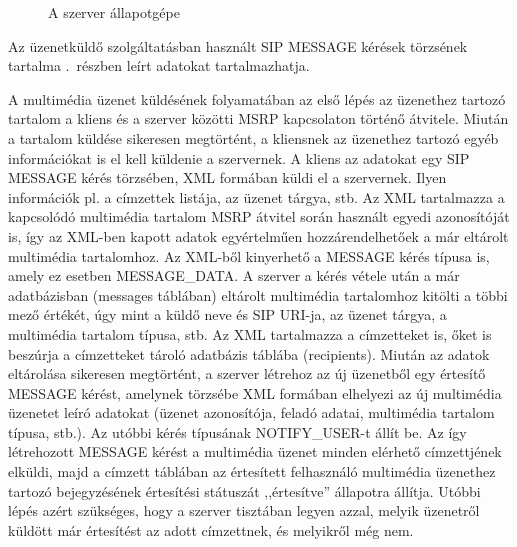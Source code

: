 \begin{figure}[htbp]
\center
{}
\caption{A szerver állapotgépe}
\label{fig:server_statemachine_message}
\end{figure}

Az üzenetküldő szolgáltatásban használt SIP MESSAGE kérések törzsének tartalma .~részben leírt adatokat tartalmazhatja.

A multimédia üzenet küldésének folyamatában az első lépés az üzenethez tartozó tartalom a kliens és a szerver közötti MSRP kapcsolaton történő átvitele. Miután a tartalom küldése sikeresen megtörtént, a kliensnek az üzenethez tartozó egyéb információkat is el kell küldenie a szervernek. A kliens az adatokat egy SIP MESSAGE kérés törzsében, XML formában küldi el a szervernek. Ilyen információk pl. a címzettek listája, az üzenet tárgya, stb. Az XML tartalmazza a kapcsolódó multimédia tartalom MSRP átvitel során használt egyedi azonosítóját is, így az XML-ben kapott adatok egyértelműen hozzárendelhetőek a már eltárolt multimédia tartalomhoz.  Az XML-ből kinyerhető a MESSAGE kérés típusa is, amely ez esetben MESSAGE\_DATA. A szerver a kérés vétele után a már adatbázisban (messages táblában) eltárolt multimédia tartalomhoz kitölti a többi mező értékét, úgy mint a küldő neve és SIP URI-ja, az üzenet tárgya, a multimédia tartalom típusa, stb. Az XML tartalmazza a címzetteket is, őket is beszúrja a címzetteket tároló adatbázis táblába (recipients). Miután az adatok eltárolása sikeresen megtörtént, a szerver létrehoz az új üzenetből egy értesítő MESSAGE kérést, amelynek törzsébe XML formában elhelyezi az új multimédia üzenetet leíró adatokat (üzenet azonosítója, feladó adatai, multimédia tartalom típusa, stb.). Az utóbbi kérés típusának NOTIFY\_USER-t állít be. Az így létrehozott MESSAGE kérést a multimédia üzenet minden elérhető címzettjének elküldi, majd a címzett táblában az értesített felhasználó multimédia üzenethez tartozó bejegyzésének értesítési státuszát ,,értesítve'' állapotra állítja. Utóbbi lépés azért szükséges, hogy a szerver tisztában legyen azzal, melyik üzenetről küldött már értesítést az adott címzettnek, és melyikről még nem.

